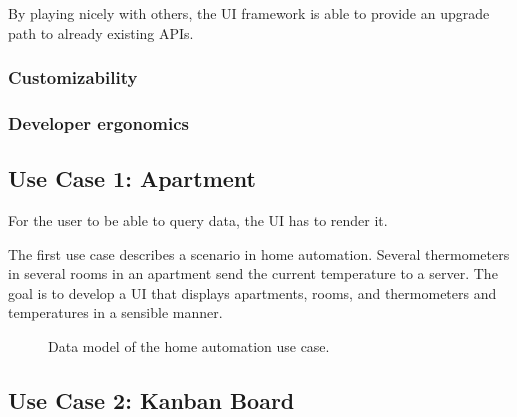 By playing nicely with others, the UI framework is able to provide an upgrade path to already existing APIs.

\subsubsection{Customizability}\label{usecases}

\subsubsection{Developer ergonomics}\label{usecases}

\subsection{Use Case 1: Apartment}\label{usecases}

For the user to be able to query data, the UI has to render it.

The first use case describes a scenario in home automation. Several thermometers in several rooms in an apartment send the current temperature to a server. The goal is to develop a UI that displays apartments, rooms, and thermometers and temperatures in a sensible manner.

\begin{figure}[!htb]
  \caption{\label{fig:my-label} Data model of the home automation use case.}
\end{figure}

\subsection{Use Case 2: Kanban Board}\label{usecases}

